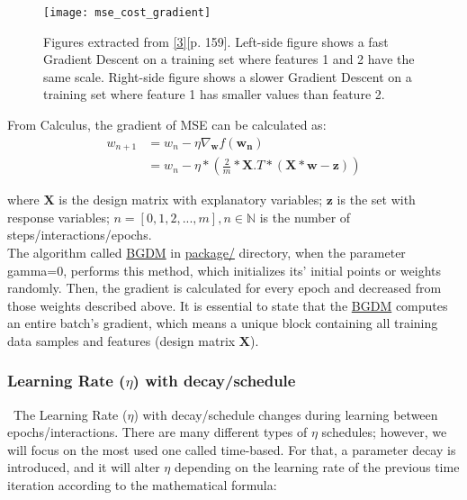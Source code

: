 \begin{figure}[H]
\label{fig:fig2}
\centering
\texttt{[image: mse\_cost\_gradient]}
\caption{Figures extracted from \hyperref[Bib:Hands-on Machine Learning]{[3]}[p. 159]. Left-side figure shows a fast Gradient Descent on a training set where features 1 and 2 have the same scale. Right-side figure shows a slower Gradient Descent on a training set where feature 1 has smaller values than feature 2.}
\end{figure}

From Calculus, the gradient of MSE can be calculated as:\\

\begin{align*}
w_{n+1} &= w_{n} - \eta \nabla_{\boldsymbol{w}} f(\boldsymbol{w_{n}})\\
&= w_{n} - \eta * (\frac{2}{m}*\boldsymbol{X}.T*(\boldsymbol{X}*\boldsymbol{w}-\boldsymbol{z}))
\end{align*}

\noindent where $\boldsymbol{X}$ is the design matrix with explanatory variables; $\boldsymbol{z}$ is the set with response variables; $n=[0, 1, 2, ..., m], n \in \mathbb{N}$ is the number of steps/interactions/epochs.\\

The algorithm called \href{https://github.com/fabiorodp/UiO-FYS-STK4155/blob/master/Project2/package/gradient_descent.py}{BGDM} in \href{https://github.com/fabiorodp/UiO-FYS-STK4155/blob/master/Project2/package/}{package/} directory, when the parameter gamma=0, performs this method, which initializes its' initial points or weights randomly. Then, the gradient is calculated for every epoch and decreased from those weights described above. It is essential to state that the \href{https://github.com/fabiorodp/UiO-FYS-STK4155/blob/master/Project2/package/gradient_descent.py}{BGDM} computes an entire batch's gradient, which means a unique block containing all training data samples and features (design matrix $\boldsymbol{X}$).

\subsubsection{Learning Rate ($\eta$) with decay/schedule}
\label{chap:Learning Rate with decay}

\quad \, The Learning Rate ($\eta$) with decay/schedule changes during learning between epochs/interactions. There are many different types of $\eta$ schedules; however, we will focus on the most used one called time-based. For that, a parameter decay is introduced, and it will alter $\eta$ depending on the learning rate of the previous time iteration according to the mathematical formula:

